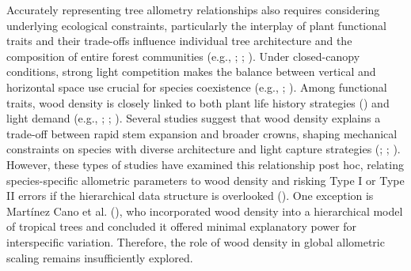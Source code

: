 \documentclass[
  12pt,
  letterpaper,
  DIV=11,
  numbers=noendperiod]{scrartcl}
\begin{document}
Accurately representing tree allometry relationships also requires
considering underlying ecological constraints, particularly the
interplay of plant functional traits and their trade-offs influence
individual tree architecture and the composition of entire forest
communities (e.g., ;
;
). Under closed-canopy
conditions, strong light competition makes the balance between vertical
and horizontal space use crucial for species coexistence (e.g.,
;
). Among functional traits,
wood density is closely linked to both plant life history strategies
() and light demand (e.g.,
; ; ). Several studies suggest that wood density explains a trade-off
between rapid stem expansion and broader crowns, shaping mechanical
constraints on species with diverse architecture and light capture
strategies (;
; ). However, these types of studies have examined this
relationship post hoc, relating species-specific allometric parameters
to wood density and risking Type I or Type II errors if the hierarchical
data structure is overlooked (). One exception is Martínez Cano et al.
(), who incorporated wood density
into a hierarchical model of tropical trees and concluded it offered
minimal explanatory power for interspecific variation. Therefore, the
role of wood density in global allometric scaling remains insufficiently
explored.
\end{document}
